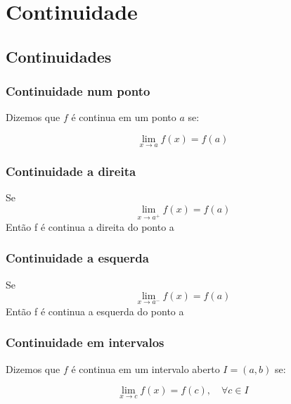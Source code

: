 \chapter{Continuidade}

\section{Continuidades}

\subsection{Continuidade num ponto}
\begin{definition}
    Dizemos que \(f\) é continua em um ponto \(a\) se:
    
    \begin{equation}
       \lim_{x \to a} f(x) = f(a) 
    \end{equation}
    
\end{definition}

\subsection{Continuidade a direita}

\begin{definition}
    Se
    \begin{equation}
       \lim_{x \to a^+} f(x) = f(a)  
    \end{equation}
    Então f é continua a direita do ponto a
\end{definition}

\subsection{Continuidade a esquerda}

\begin{definition}
    Se
    \begin{equation}
       \lim_{x \to a^-} f(x) = f(a)  
    \end{equation}
    Então f é continua a esquerda do ponto a
\end{definition}

\subsection{Continuidade em intervalos}

\begin{definition}
    Dizemos que \(f\) é continua em um intervalo aberto \( I = (a, b)\) se:
    
    \begin{equation}
       \lim_{x \to c} f(x) = f(c),\quad \forall c \in I
    \end{equation}
    
\end{definition}

